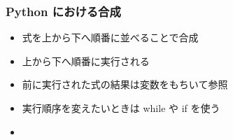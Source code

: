 \begin{frame}[label=composit]
\frametitle{Python における合成}
  \begin{itemize}
\item 式を上から下へ順番に並べることで合成
\item 上から下へ順番に実行される
\item 前に実行された式の結果は変数をもちいて参照
\item 実行順序を変えたいときは while や if を使う
\item \hyperlink{mult}{}
  \end{itemize}
\end{frame}
